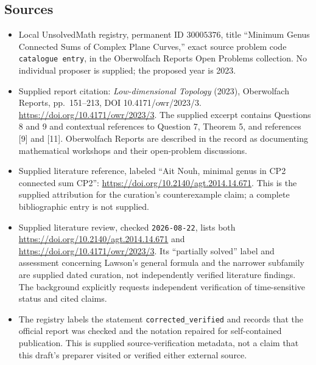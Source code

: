 \documentclass[11pt]{article}
\begin{document}
\subsection{Sources}
\begin{itemize}
\item Local UnsolvedMath registry, permanent ID \(30005376\), title ``Minimum Genus Connected Sums of Complex Plane Curves,'' exact source problem code \texttt{catalogue entry}, in the Oberwolfach Reports Open Problems collection. No individual proposer is supplied; the proposed year is 2023.
\item Supplied report citation: \emph{Low-dimensional Topology} (2023), Oberwolfach Reports, pp.\ 151--213, DOI 10.4171/owr/2023/3. \url{https://doi.org/10.4171/owr/2023/3}. The supplied excerpt contains Questions 8 and 9 and contextual references to Question 7, Theorem 5, and references [9] and [11]. Oberwolfach Reports are described in the record as documenting mathematical workshops and their open-problem discussions.
\item Supplied literature reference, labeled ``Ait Nouh, minimal genus in CP2 connected sum CP2'': \url{https://doi.org/10.2140/agt.2014.14.671}. This is the supplied attribution for the curation's counterexample claim; a complete bibliographic entry is not supplied.
\item Supplied literature review, checked \texttt{2026-08-22}, lists both \url{https://doi.org/10.2140/agt.2014.14.671} and \url{https://doi.org/10.4171/owr/2023/3}. Its ``partially solved'' label and assessment concerning Lawson's general formula and the narrower subfamily are supplied dated curation, not independently verified literature findings. The background explicitly requests independent verification of time-sensitive status and cited claims.
\item The registry labels the statement \texttt{corrected\_verified} and records that the official report was checked and the notation repaired for self-contained publication. This is supplied source-verification metadata, not a claim that this draft's preparer visited or verified either external source.
\end{itemize}
\end{document}
